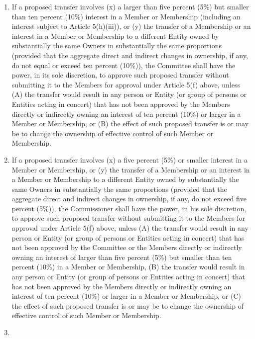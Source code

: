 \documentclass[]{book}
\providecommand{\tightlist}{%
  \setlength{\itemsep}{0pt}\setlength{\parskip}{0pt}}
\begin{document}
\begin{enumerate}
  \begin{enumerate}
  \def\labelenumii{(\roman{enumii})}
  \tightlist
  \item
    If a proposed transfer involves (x) a larger than five percent (5\%) but smaller than ten percent (10\%) interest in a Member or Membership (including an interest subject to Article 5(h)(iii)), or (y) the transfer of a Membership or an interest in a Member or Membership to a different Entity owned by substantially the same Owners in substantially the same proportions (provided that the aggregate direct and indirect changes in ownership, if any, do not equal or exceed ten percent (10\%)), the Committee shall have the power, in its sole discretion, to approve such proposed transfer without submitting it to the Members for approval under Article 5(f) above, unless (A) the transfer would result in any person or Entity (or group of persons or Entities acting in concert) that has not been approved by the Members directly or indirectly owning an interest of ten percent (10\%) or larger in a Member or Membership, or (B) the effect of such proposed transfer is or may be to change the ownership of effective control of such Member or Membership.
  \item
    If a proposed transfer involves (x) a five percent (5\%) or smaller interest in a Member or Membership, or (y) the transfer of a Membership or an interest in a Member or Membership to a different Entity owned by substantially the same Owners in substantially the same proportions (provided that the aggregate direct and indirect changes in ownership, if any, do not exceed five percent (5\%)), the Commissioner shall have the power, in his sole discretion, to approve such proposed transfer without submitting it to the Members for approval under Article 5(f) above, unless (A) the transfer would result in any person or Entity (or group of persons or Entities acting in concert) that has not been approved by the Committee or the Members directly or indirectly owning an interest of larger than five percent (5\%) but smaller than ten percent (10\%) in a Member or Membership, (B) the transfer would result in any person or Entity (or group of persons or Entities acting in concert) that has not been approved by the Members directly or indirectly owning an interest of ten percent (10\%) or larger in a Member or Membership, or (C) the effect of such proposed transfer is or may be to change the ownership of effective control of such Member or Membership.
  \item

\end{enumerate}
\end{enumerate}
\end{document}
